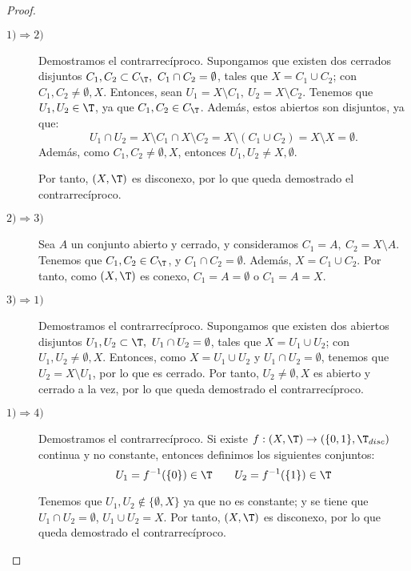 \begin{proof}\
    \begin{description}
        \item[$1)\Longrightarrow 2)$]
        Demostramos el contrarrecíproco. Supongamos que existen dos cerrados disjuntos $C_1,C_2\subset C_{\T},~C_1\cap C_2=\emptyset$, tales que $X=C_1\cup C_2$; con $C_1,C_2\neq \emptyset, X$.
        Entonces, sean $U_1=X\setminus C_1,~U_2=X\setminus C_2$. Tenemos que $U_1,U_2\in \T$, ya que $C_1,C_2\in C_{\T}$.
        Además, estos abiertos son disjuntos, ya que:
        $$U_1\cap U_2=X\setminus C_1 \cap X\setminus C_2 = X\setminus (C_1\cup C_2) = X\setminus X = \emptyset.$$
        Además, como $C_1,C_2\neq \emptyset, X$, entonces $U_1,U_2\neq X, \emptyset$.

        Por tanto, $(X,\T)$ es disconexo, por lo que queda demostrado el contrarrecíproco.

        \item [$2)\Longrightarrow 3)$] Sea $A$ un conjunto abierto y cerrado, y consideramos $C_1=A,~C_2=X\setminus A$. Tenemos que $C_1,C_2\in C_{\T}$, y $C_1\cap C_2=\emptyset$.
        Además, $X=C_1\cup C_2$. Por tanto, como $(X,\T)$ es conexo, $C_1=A=\emptyset$ o $C_1=A=X$.

        \item [$3)\Longrightarrow 1)$] Demostramos el contrarrecíproco. Supongamos que existen dos abiertos disjuntos $U_1,U_2\subset \T,~U_1\cap U_2=\emptyset$, tales que $X=U_1\cup U_2$; con $U_1,U_2\neq \emptyset, X$.
        Entonces, como $X=U_1\cup U_2$ y $U_1\cap U_2=\emptyset$, tenemos que $U_2=X\setminus U_1$, por lo que es cerrado. Por tanto, $U_2\neq \emptyset, X$ es abierto y cerrado a la vez, por lo que queda demostrado el contrarrecíproco.

        \item [$1)\Longrightarrow 4)$] Demostramos el contrarrecíproco.
        Si existe $f:(X,\T)\to \left(\{0,1\},\T_{disc}\right)$ continua y no constante, entonces definimos los siguientes conjuntos:
        \begin{equation*}
            U_1=f^{-1}(\{0\})\in \T
            \qquad
            U_2=f^{-1}(\{1\})\in \T
        \end{equation*}

        Tenemos que $U_1,U_2\notin \{\emptyset, X\}$ ya que no es constante; y se tiene que $U_1\cap U_2=\emptyset$, $U_1\cup U_2 = X$. Por tanto, $(X,\T)$ es disconexo, por lo que queda demostrado el contrarrecíproco.


\end{description}
\end{proof}
